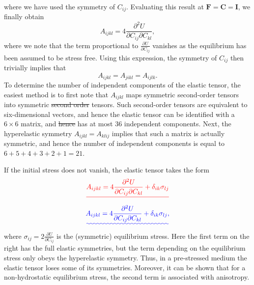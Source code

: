 \documentclass[a4paper,10pt]{paper}
\providecommand{\DIFadd}[1]{{\protect\color{blue}\uwave{#1}}} %
\providecommand{\DIFdel}[1]{{\protect\color{red}\sout{#1}}}                      %
\providecommand{\DIFaddbegin}{} %
\providecommand{\DIFaddend}{} %
\providecommand{\DIFdelbegin}{} %
\providecommand{\DIFdelend}{} %
\begin{document}
\begin{enumerate}
\begin{align*}
{}\end{align*}\DIFaddend 
where we have used the symmetry of $C_{ij}$. Evaluating this result at $\mathbf{F}=\mathbf{C}=\mathbf{I}$, we finally obtain
\begin{equation*}
    A_{ijkl}=4\frac{\partial^{2}U}{\partial C_{ij}\partial C_{kl}},
\end{equation*}
where we note that the term proportional to $\frac{\partial U}{\partial C_{lj}}$ vanishes as the equilibrium has been assumed to be stress free. Using this expression, the symmetry of $C_{ij}$ then trivially implies that
\begin{equation*}
    A_{ijkl}=A_{jikl}=A_{ijlk}.
\end{equation*}
To determine the number of independent components of the elastic tensor, the easiest method is to first note that $A_{ijkl}$ maps symmetric second-order tensors into symmetric \DIFdelbegin \DIFdel{second order }\DIFdelend \DIFaddbegin \DIFadd{second-order }\DIFaddend tensors. Such second-order tensors are equivalent to six-dimensional vectors, and hence the elastic tensor can be identified with a $6\times6$ matrix, and \DIFdelbegin \DIFdel{hence }\DIFdelend \DIFaddbegin \DIFadd{so }\DIFaddend has at most 36 independent components. Next, the hyperelastic symmetry $A_{ijkl}=A_{klij}$ implies that such a matrix is actually symmetric, and hence the number of independent components is equal to $6+5+4+3+2+1=21$.

If the initial stress does not vanish, the elastic tensor takes the form
\DIFdelbegin \begin{displaymath}
    \DIFdel{A_{ijkl}=4\frac{\partial^{2}U}{\partial C_{ij}\partial C_{kl}}+\delta_{ik}\sigma_{lj}
}\end{displaymath}%
\DIFdelend \DIFaddbegin \begin{equation*}
    \DIFadd{A_{ijkl}=4\frac{\partial^{2}U}{\partial C_{ij}\partial C_{kl}}+\delta_{ik}\sigma_{lj},
}\end{equation*}\DIFaddend 
where $\sigma_{ij}=2\frac{\partial U}{\partial C_{ij}}$ is the (symmetric) equilibrium stress. Here the first term on the right has the full elastic symmetries, but the term depending on the equilibrium stress only obeys the hyperelastic symmetry. Thus, in a pre-stressed medium the elastic tensor loses some of its symmetries. Moreover, it can be shown that for a non-hydrostatic equilibrium stress, the second term is associated with anisotropy.


\end{enumerate}
\end{document}
